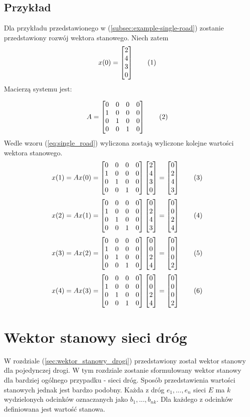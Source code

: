 \documentclass[12pt]{book}
\theoremstyle{plain}
\newcommand\addtag{\refstepcounter{equation}
\renewcommand{\labelenumii}{\theenumii}
\renewcommand{\theenumii}{\theenumi.\arabic{enumii}.}
\tag{\theequation}}
\begin{document}
\subsection{Przykład}
Dla przykładu przedstawionego w (\ref{subsec:example-single-road}) zostanie przedstawiony rozwój wektora stanowego. Niech zatem
\def \xZero {\begin{bmatrix}
	2 \\ 4 \\ 3 \\ 0
	\end{bmatrix}}
\[x(0)=\xZero \addtag \]
Macierzą systemu jest:
\def \A {\begin{bmatrix}
		0 & 0 & 0 & 0 \\
		1 & 0 & 0 & 0 \\
		0 & 1 & 0 & 0 \\
		0 & 0 & 1 & 0 \\
\end{bmatrix}}

\[
A=\A \addtag
\]
Wedle wzoru (\ref{eq:single_road}) wyliczona zostają wyliczone kolejne wartości wektora stanowego.
\def \xI {\begin{bmatrix}
		0 \\ 2 \\ 4 \\ 3
\end{bmatrix}}
\[
x(1)=Ax(0)=\A \xZero = \xI \addtag
\]
\def \xII {\begin{bmatrix}
		0 \\ 0 \\ 2 \\ 4
\end{bmatrix}}
\[
x(2)=Ax(1)=\A \xI = \xII \addtag
\]
\def \xIII {\begin{bmatrix}
		0 \\ 0 \\ 0 \\ 2
\end{bmatrix}}
\[
x(3)=Ax(2)=\A \xII = \xIII \addtag
\]
\def \xIV {\begin{bmatrix}
		0 \\ 0 \\ 0 \\ 2
\end{bmatrix}}
\[
x(4)=Ax(3)=\A \xII = \xIV \addtag
\]

\section {Wektor stanowy sieci dróg}
W rozdziale (\ref{sec:wektor_stanowy_drogi}) przedstawiony został wektor stanowy dla pojedynczej drogi. W tym rozdziale zostanie sformułowany wektor stanowy dla bardziej ogólnego przypadku - sieci dróg. Sposób przedstawienia wartości stanowych jednak jest bardzo podobny. Każda z dróg $e_1,...,e_n$ sieci $E$ ma $k$ wydzielonych odcinków oznaczanych jako $b_1,...,b_{nk}$. Dla każdego z odcinków definiowana jest wartość stanowa.
\end{document}
